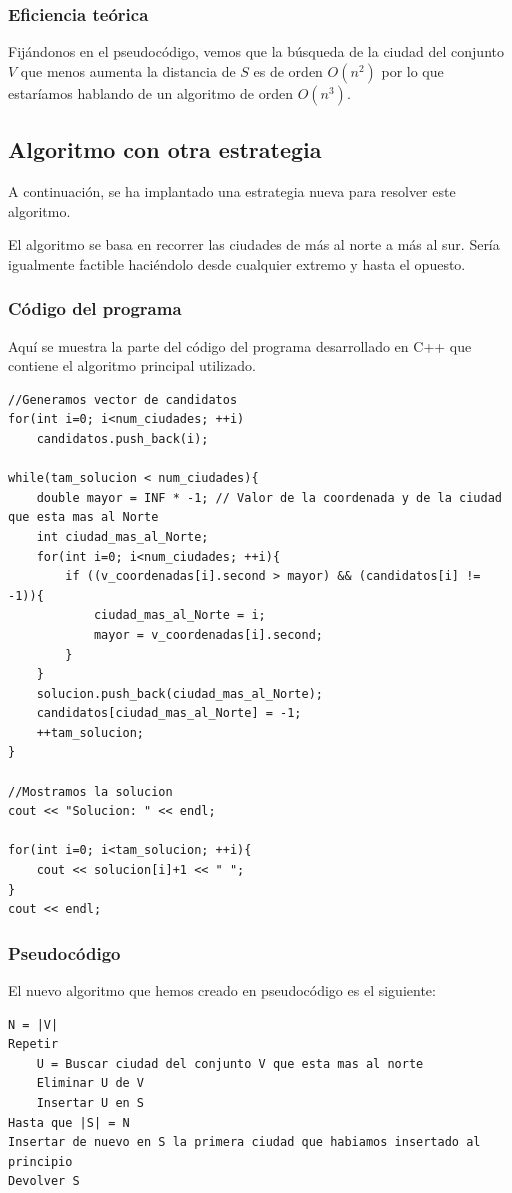 \documentclass[11pt,a4paper]{article} %
\begin{document}
\subsubsection{Eficiencia teórica}
Fijándonos en el pseudocódigo, vemos que la búsqueda de la ciudad del conjunto $V$ que menos aumenta la distancia de $S$ es de orden $O(n^2)$ por lo que estaríamos hablando de un algoritmo de orden $O(n^3)$.


\newpage
\subsection{Algoritmo con otra estrategia}
A continuación, se ha implantado una estrategia nueva para resolver este algoritmo.

El algoritmo se basa en recorrer las ciudades de más al norte a más al sur. Sería igualmente factible haciéndolo desde cualquier extremo y hasta el opuesto.

\subsubsection{Código del programa}
Aquí se muestra la parte del código del programa desarrollado en C++ que contiene el algoritmo principal utilizado.

\begin{lstlisting}[style=C++]
//Generamos vector de candidatos
for(int i=0; i<num_ciudades; ++i)
	candidatos.push_back(i);

while(tam_solucion < num_ciudades){
	double mayor = INF * -1; // Valor de la coordenada y de la ciudad que esta mas al Norte
	int ciudad_mas_al_Norte;
	for(int i=0; i<num_ciudades; ++i){
		if ((v_coordenadas[i].second > mayor) && (candidatos[i] != -1)){
			ciudad_mas_al_Norte = i;
			mayor = v_coordenadas[i].second;
		}
	}
	solucion.push_back(ciudad_mas_al_Norte);
	candidatos[ciudad_mas_al_Norte] = -1;
	++tam_solucion;
}

//Mostramos la solucion
cout << "Solucion: " << endl;

for(int i=0; i<tam_solucion; ++i){
	cout << solucion[i]+1 << " ";
}
cout << endl;
\end{lstlisting}

\subsubsection{Pseudocódigo}
El nuevo algoritmo que hemos creado en pseudocódigo es el siguiente:
\begin{lstlisting}
N = |V|
Repetir
	U = Buscar ciudad del conjunto V que esta mas al norte
	Eliminar U de V
	Insertar U en S
Hasta que |S| = N
Insertar de nuevo en S la primera ciudad que habiamos insertado al principio
Devolver S
\end{lstlisting}
\end{document}
